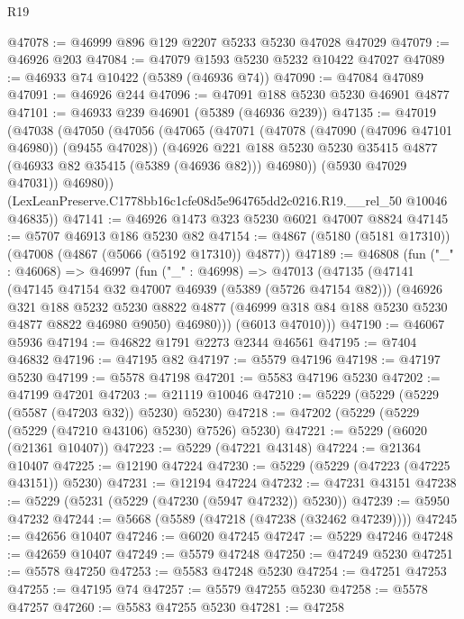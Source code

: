 \begin{lexlean}{R19}
\begin{coremodule}
@47078 := @46999 @896 @129 @2207 @5233 @5230 @47028 @47029
@47079 := @46926 @203
@47084 := @47079 @1593 @5230 @5232 @10422 @47027
@47089 := @46933 @74 @10422 (@5389 (@46936 @74))
@47090 := @47084 @47089
@47091 := @46926 @244
@47096 := @47091 @188 @5230 @5230 @46901 @4877
@47101 := @46933 @239 @46901 (@5389 (@46936 @239))
@47135 := @47019
    (@47038
      (@47050
        (@47056
          (@47065
            (@47071
              (@47078 (@47090 (@47096 @47101 @46980)) (@9455 @47028))
              (@46926
                @221
                @188
                @5230
                @5230
                @35415
                @4877
                (@46933 @82 @35415 (@5389 (@46936 @82)))
                @46980))
            (@5930 @47029 @47031))
          @46980))
      (LexLeanPreserve.C1778bb16c1cfe08d5e964765dd2c0216.R19.__rel_50 @10046 @46835))
@47141 := @46926 @1473 @323 @5230 @6021 @47007 @8824
@47145 := @5707 @46913 @186 @5230 @82
@47154 := @4867 (@5180 (@5181 @17310)) (@47008 (@4867 (@5066 (@5192 @17310)) @4877))
@47189 := @46808
    (fun ("_" : @46068) =>
    @46997
      (fun ("_" : @46998) =>
      @47013
        (@47135
          (@47141
            (@47145 @47154 @32 @47007 @46939 (@5389 (@5726 @47154 @82)))
            (@46926
              @321
              @188
              @5232
              @5230
              @8822
              @4877
              (@46999 @318 @84 @188 @5230 @5230 @4877 @8822 @46980 @9050)
              @46980)))
        (@6013 @47010)))
@47190 := @46067 @5936
@47194 := @46822 @1791 @2273 @2344 @46561
@47195 := @7404 @46832
@47196 := @47195 @82
@47197 := @5579 @47196
@47198 := @47197 @5230
@47199 := @5578 @47198
@47201 := @5583 @47196 @5230
@47202 := @47199 @47201
@47203 := @21119 @10046
@47210 := @5229 (@5229 (@5229 (@5587 (@47203 @32)) @5230) @5230)
@47218 := @47202 (@5229 (@5229 (@5229 (@47210 @43106) @5230) @7526) @5230)
@47221 := @5229 (@6020 (@21361 @10407))
@47223 := @5229 (@47221 @43148)
@47224 := @21364 @10407
@47225 := @12190 @47224
@47230 := @5229 (@5229 (@47223 (@47225 @43151)) @5230)
@47231 := @12194 @47224
@47232 := @47231 @43151
@47238 := @5229 (@5231 (@5229 (@47230 (@5947 @47232)) @5230))
@47239 := @5950 @47232
@47244 := @5668 (@5589 (@47218 (@47238 (@32462 @47239))))
@47245 := @42656 @10407
@47246 := @6020 @47245
@47247 := @5229 @47246
@47248 := @42659 @10407
@47249 := @5579 @47248
@47250 := @47249 @5230
@47251 := @5578 @47250
@47253 := @5583 @47248 @5230
@47254 := @47251 @47253
@47255 := @47195 @74
@47257 := @5579 @47255 @5230
@47258 := @5578 @47257
@47260 := @5583 @47255 @5230
@47281 := @47258

\end{coremodule}
\end{lexlean}
